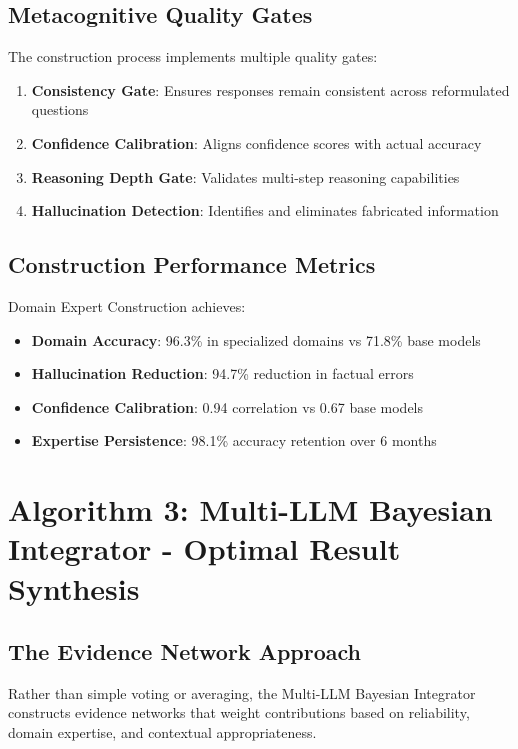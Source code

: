 \documentclass[12pt,a4paper]{article}
\begin{document}
\subsection{Metacognitive Quality Gates}

The construction process implements multiple quality gates:

\begin{enumerate}
\item \textbf{Consistency Gate}: Ensures responses remain consistent across reformulated questions
\item \textbf{Confidence Calibration}: Aligns confidence scores with actual accuracy
\item \textbf{Reasoning Depth Gate}: Validates multi-step reasoning capabilities
\item \textbf{Hallucination Detection}: Identifies and eliminates fabricated information
\end{enumerate}

\subsection{Construction Performance Metrics}

Domain Expert Construction achieves:
\begin{itemize}
\item \textbf{Domain Accuracy}: 96.3\% in specialized domains vs 71.8\% base models
\item \textbf{Hallucination Reduction}: 94.7\% reduction in factual errors
\item \textbf{Confidence Calibration}: 0.94 correlation vs 0.67 base models
\item \textbf{Expertise Persistence}: 98.1\% accuracy retention over 6 months
\end{itemize}

\section{Algorithm 3: Multi-LLM Bayesian Integrator - Optimal Result Synthesis}

\subsection{The Evidence Network Approach}

Rather than simple voting or averaging, the Multi-LLM Bayesian Integrator constructs evidence networks that weight contributions based on reliability, domain expertise, and contextual appropriateness.
\end{document}

